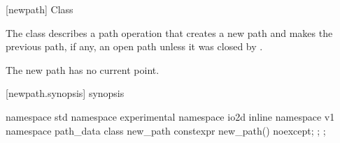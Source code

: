  [newpath] {Class }

\pnum
{}
The class  describes a path operation that creates a new path and makes the previous path, if any, an open path unless it was closed by .

\pnum
The new path has no current point.

 [newpath.synopsis] { synopsis}

\begin{codeblock}
namespace std { namespace experimental { namespace io2d { inline namespace v1 {
  namespace path_data {
    class new_path {
      constexpr new_path() noexcept;
    };
  };
} } } }
\end{codeblock}
